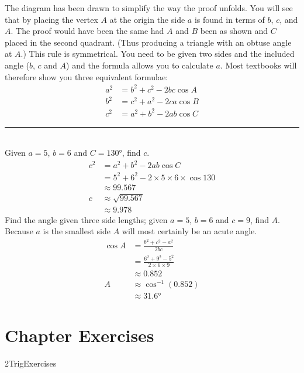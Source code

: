 The diagram has been drawn to simplify the way the proof unfolds. You will see that by placing the vertex $A$ at the origin the side $a$ is found in terms of $b$, $c$, and $A$. The proof would have been the same had $A$ and $B$ been as shown and $C$ placed in the second quadrant. (Thus producing a triangle with an obtuse angle at $A$.) This rule is symmetrical. You need to be given two sides and the included angle ($b$, $c$ and $A$) and the formula allows you to calculate $a$. Most textbooks will therefore show you three equivalent formulae:
\begin{align*}a^{2} &  = b^{2} +c^{2} -2 b c \cos  A \\
b^{2} &  = c^{2} +a^{2} -2 c a \cos  B \\
c^{2} &  = a^{2} +b^{2} -2 a b \cos  C\end{align*}
\rule{6.8cm}{0.5pt}\\
\example Given $a =5$, $b =6$ and $C =\ang{130} $, find $c$.\medskip\\
\solution
\begin{align*}c^{2} &  = a^{2} +b^{2} -2 a b \cos  C \\
&  = 5^{2} +6^{2} -2 \times 5 \times 6 \times \cos  130  \\
&  \approx   99.567 \\
c &  \approx   \sqrt{99.567} \\
&  \approx   9.978\end{align*}
\clearpage
\example Find the angle given three side lengths; given $a =5$, $b =6$ and $c =9$, find $A$. \medskip\\
\solution Because $a$ is the smallest side $A$ will most certainly be an acute angle.
\begin{align*}\cos  A &  = \frac{b^{2} +c^{2} -a^{2}}{2 b c} \\
&  = \frac{6^{2} +9^{2} -5^{2}}{2 \times 6 \times 9} \\
&  \approx 0.852 \\
A &  \approx \cos ^{ -1} \left (0.852\right ) \\
&  \approx \ang{31.6} 
\end{align*}

\section{Chapter Exercises}
{2TrigExercises}

